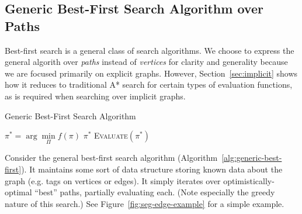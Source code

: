 \documentclass{report}
\begin{document}
\subsection{Generic Best-First Search Algorithm over Paths}

Best-first search \cite{winston1977ai}
is a general class of search algorithms.
We choose to express the general algorith
over \emph{paths} instead of \emph{vertices}
for clarity and generality
because we are focused primarily on explicit graphs.
However, Section~\ref{sec:implicit} shows
how it reduces to traditional A* search
for certain types of evaluation functions,
as is required when searching over implicit graphs.

\begin{algorithm}
\caption{Generic Best-First Search Algorithm}
\label{alg:generic-best-first}
\begin{algorithmic}[1]
\Loop
   \State $\pi^* = \arg \min\limits_{\Pi} f(\pi)$
      \label{line:select-optimistic-path}
      \State \Return $\pi^*$
   \EndIf
   \State \textsc{Evaluate}$(\pi^*)$
\EndLoop
\EndProcedure
\end{algorithmic}
\end{algorithm}

Consider the general best-first search algorithm
(Algorithm~\ref{alg:generic-best-first}).
It maintains some sort of data structure storing known data about the
graph (e.g. tags on vertices or edges).
It simply iterates over optimistically-optimal ``best'' paths,
partially evaluating each.
(Note especially the greedy nature of this search.)
See Figure~\ref{fig:seg-edge-example} for a simple example.
\end{document}
